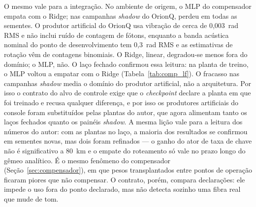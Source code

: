 \documentclass[12pt]{article}
\begin{document}
O mesmo vale para a integração. No ambiente de origem, o MLP do compensador
empata com o Ridge; nas campanhas \textit{shadow} do OrionQ, perdeu em todas as
sementes. O produtor artificial do OrionQ usa vibração de cerca de 0,003~rad
RMS e não inclui ruído de contagem de fótons, enquanto a banda acústica nominal
do ponto de desenvolvimento tem 0,3~rad RMS e as estimativas de rotação vêm de
contagens binomiais. O Ridge, linear, degradou-se menos fora do domínio; o MLP,
não. O laço fechado confirmou essa leitura: na planta de treino, o MLP voltou a
empatar com o Ridge (Tabela~\ref{tab:comp_lf}). O fracasso nas campanhas
\textit{shadow} media o domínio do produtor artificial, não a arquitetura. Por
isso o contrato do alvo de controle exige que o \textit{checkpoint} declare a
planta em que foi treinado e recusa qualquer diferença, e por isso os produtores
artificiais do console foram substituídos pelas plantas do autor, que agora
alimentam tanto os laços fechados quanto os painéis \textit{shadow}. A mesma
lição vale para a leitura dos números do autor: com as plantas no laço, a
maioria dos resultados se confirmou em sementes novas, mas dois foram
refinados --- o ganho do ator de taxa de chave não é significativo a 80~km e o
empate do roteamento só vale no prazo longo do gêmeo analítico. É o mesmo fenômeno do
compensador (Seção~\ref{sec:compensador}), em que pesos transplantados entre pontos de operação
ficaram piores que não compensar. O contrato, porém, compara declarações: ele
impede o uso fora do ponto declarado, mas não detecta sozinho uma fibra real que
mude de tom.
\end{document}
